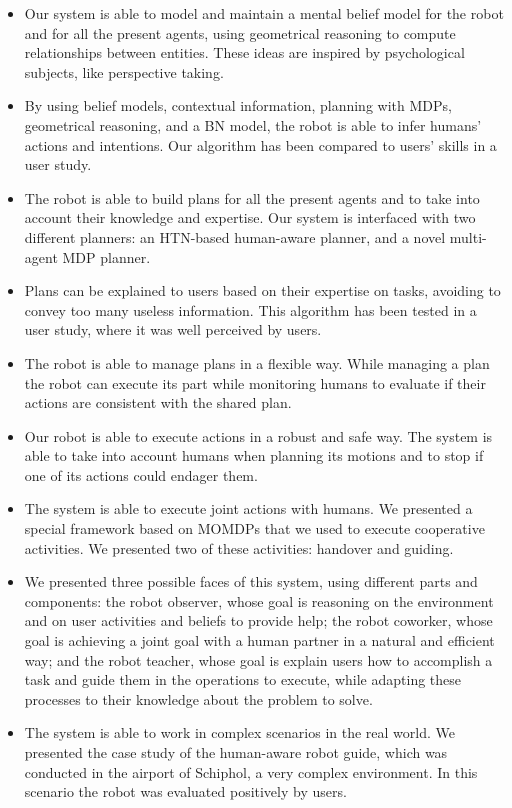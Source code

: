 \begin{itemize}
\item Our system is able to model and maintain a mental belief model for the robot and for all the present agents, using geometrical reasoning to compute relationships between entities. These ideas are inspired by psychological subjects, like perspective taking.
\item By using belief models, contextual information, planning with MDPs,  geometrical reasoning, and a BN model, the robot is able to infer humans' actions and intentions. Our algorithm has been compared to users' skills in a user study.
\item The robot is able to build plans for all the present agents and to take into account their knowledge and expertise. Our system is interfaced with two different planners: an HTN-based human-aware planner, and a novel multi-agent MDP planner.
\item Plans can be explained to users based on their expertise on tasks, avoiding to convey too many useless information. This algorithm has been tested in a user study, where it was well perceived by users.
\item The robot is able to manage plans in a flexible way. While managing a plan the robot can execute its part while monitoring humans to evaluate if their actions are consistent with the shared plan.
\item Our robot is able to execute actions in a robust and safe way. The system is able to take into account humans when planning its motions and to stop if one of its actions could endager them.
\item The system is able to execute joint actions with humans. We presented a special framework based on MOMDPs that we used to execute cooperative activities. We presented two of these activities: handover and guiding.
\item We presented three possible faces of this system, using different parts and components: the robot observer, whose goal is reasoning on the environment and on user activities and beliefs to provide help; the robot coworker, whose goal is achieving a joint goal with a human partner in a natural and efficient way; and the robot teacher, whose goal is explain users how to accomplish a task and guide them in the operations to execute, while adapting these processes to their knowledge about the problem to solve. 
\item The system is able to work in complex scenarios in the real world. We presented the case study of the human-aware robot guide, which was conducted in the airport of Schiphol, a very complex environment. In this scenario the robot was evaluated positively by users.
\end{itemize}


